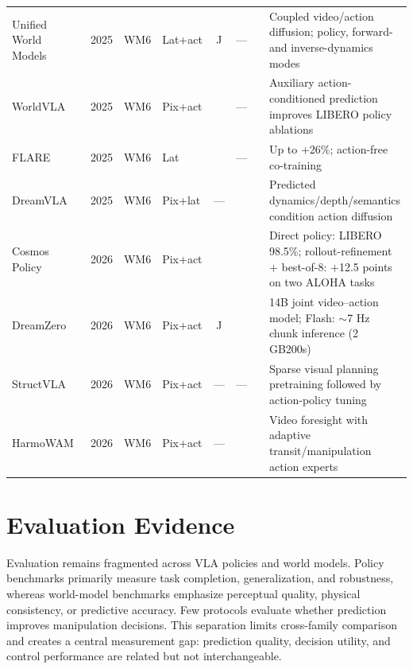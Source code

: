 \documentclass{ieeeaccess}
\newcommand{\cmark}{\ding{51}}
\begin{document}
\begin{table}[!t]
\begin{tabular}{p{2.7cm}p{1.35cm}p{0.9cm}p{1.2cm}cccp{5.9cm}}
\textcolor[RGB]{104,48,148}{Unified World Models~\cite{uwm}} & \textcolor[RGB]{104,48,148}{2025} & \textcolor[RGB]{104,48,148}{WM6} & \textcolor[RGB]{104,48,148}{Lat+act} & \textcolor[RGB]{104,48,148}{J} & \textcolor[RGB]{104,48,148}{---} & \textcolor[RGB]{104,48,148}{\cmark} & \textcolor[RGB]{104,48,148}{Coupled video/action diffusion; policy, forward- and inverse-dynamics modes} \\
WorldVLA~\cite{worldvla} & 2025 & WM6 & Pix+act & \cmark & --- & \cmark & Auxiliary action-conditioned prediction improves LIBERO policy ablations \\
FLARE~\cite{flarewm} & 2025 & WM6 & Lat & \cmark & --- & \cmark & Up to +26\%; action-free co-training \\
DreamVLA~\cite{dreamvla} & 2025 & WM6 & Pix+lat & --- & \cmark & \cmark & Predicted dynamics/depth/semantics condition action diffusion \\
Cosmos Policy~\cite{cosmospolicy} & 2026 & WM6 & Pix+act & \cmark & \cmark & \cmark & Direct policy: LIBERO 98.5\%; rollout-refinement + best-of-8: +12.5 points on two ALOHA tasks \\
DreamZero~\cite{dreamzero} & 2026 & WM6 & Pix+act & J & \cmark & \cmark & 14B joint video--action model; Flash: $\sim$7 Hz chunk inference (2 GB200s) \\
StructVLA~\cite{structvla} & 2026 & WM6 & Pix+act & --- & --- & \cmark & Sparse visual planning pretraining followed by action-policy tuning \\
HarmoWAM~\cite{harmowam} & 2026 & WM6 & Pix+act & --- & \cmark & \cmark & Video foresight with adaptive transit/manipulation action experts \\
\bottomrule
\end{tabular}
\end{table}






\section{Evaluation Evidence}
\label{sec:benchmarks}

Evaluation remains fragmented across VLA policies and world models. Policy benchmarks primarily measure task completion, generalization, and robustness, whereas world-model benchmarks emphasize perceptual quality, physical consistency, or predictive accuracy. Few protocols evaluate whether prediction improves manipulation decisions. This separation limits cross-family comparison and creates a central measurement gap: prediction quality, decision utility, and control performance are related but not interchangeable.
\end{document}
